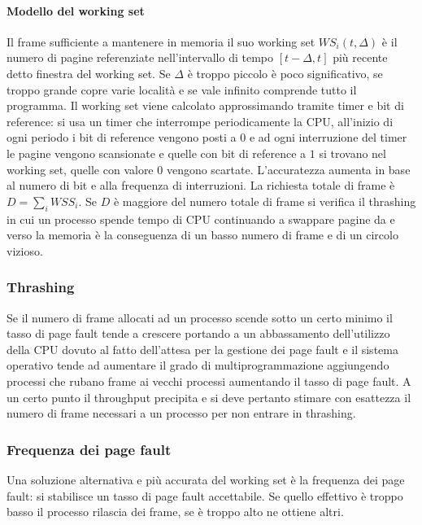 \paragraph{Modello del working set}
Il frame sufficiente a mantenere in memoria il suo working set $WS_i(t, \Delta)$ \`e il numero di pagine referenziate nell'intervallo di tempo $[t-\Delta, t]$ pi\`u recente detto 
finestra del working set. Se $\Delta$ \`e troppo piccolo \`e poco significativo, se troppo grande copre varie localit\`a e se vale infinito comprende tutto il programma. Il working
set viene calcolato approssimando tramite timer e bit di reference: si usa un timer che interrompe periodicamente la CPU, all'inizio di ogni periodo i bit di reference vengono posti
a $0$ e ad ogni interruzione del timer le pagine vengono scansionate e quelle con bit di reference a $1$ si trovano nel working set, quelle con valore $0$ vengono scartate. 
L'accuratezza aumenta in base al numero di bit e alla frequenza di interruzioni. La richiesta totale di frame \`e $D = \sum_i WSS_i$. Se $D$ \`e maggiore del numero totale di frame
si verifica il thrashing in cui un processo spende tempo di CPU continuando a swappare pagine da e verso la memoria \`e la conseguenza di un basso numero di frame e di un circolo 
vizioso.
\subsubsection{Thrashing}
Se il numero di frame allocati ad un processo scende sotto un certo minimo il tasso di page fault tende a crescere portando a un abbassamento dell'utilizzo della CPU dovuto al fatto
dell'attesa per la gestione dei page fault e il sistema operativo tende ad aumentare il grado di multiprogrammazione aggiungendo processi che rubano frame ai vecchi processi aumentando
il tasso di page fault. A un certo punto il throughput precipita e si deve pertanto stimare con esattezza il numero di frame necessari a un processo per non entrare in thrashing. 
\subsubsection{Frequenza dei page fault}
Una soluzione alternativa e pi\`u accurata del working set \`e la frequenza dei page fault: si stabilisce un tasso di page fault accettabile. Se quello effettivo \`e troppo basso il
processo rilascia dei frame, se \`e troppo alto ne ottiene altri. 
